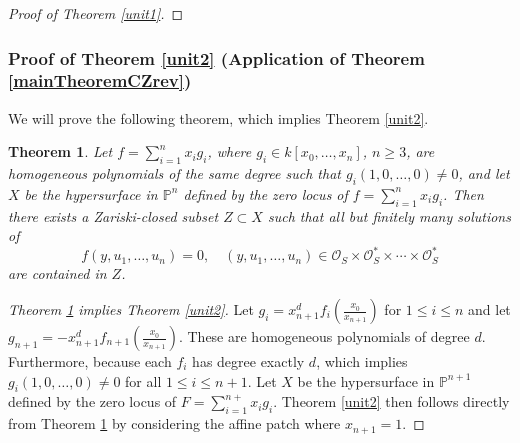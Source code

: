 \documentclass[10pt]{amsart}
\numberwithin{equation}{section}
\theoremstyle{plain}
\newtheorem{theorem}{Theorem}[section]
\theoremstyle{definition}
\begin{document}
\begin{proof}[Proof of Theorem  \ref{unit1}]
\end{proof}
 
 
\subsubsection{\bf Proof of Theorem  \ref{unit2} (Application of Theorem \ref{mainTheoremCZrev})}\label{Secunit2}
We will prove the following theorem, which implies Theorem  \ref{unit2}.
\begin{theorem}\label{UnitCZ}
Let $f=\sum_{i=1}^n x_i g_i$, where $g_i \in k[x_0,\ldots,x_n]$, $n\ge 3$, are homogeneous polynomials of the same degree such that $g_i(1,0,\ldots,0)\ne 0$, and  let $X$  be the hypersurface  in $\mathbb P^n$ defined by the zero locus of  $f=\sum_{i=1}^nx_ig_i$.   Then there exists a Zariski-closed subset $Z \subset X$ such that all but finitely many solutions of
\[
f(y,u_1,\ldots,u_n)=0, \quad (y,u_1,\ldots,u_n)\in \mathcal O_S\times \mathcal O_S^*\times\cdots\times \mathcal O_S^*
\]
are contained in $Z$.
\end{theorem}

\begin{proof}[Theorem \ref{UnitCZ} implies  Theorem  \ref{unit2}]
Let $g_i=x_{n+1}^d f_i(\frac{x_0}{x_{n+1}})$ for $1\le i\le n$ and let $g_{n+1}= -x_{n+1}^d f_{n+1}(\frac{x_0}{x_{n+1}}) $. These are homogeneous polynomials of degree $d$.  Furthermore, because each $f_i$ has degree exactly $d$, which implies
 $g_i(1,0,\hdots,0)\ne 0$ for all  $1\le i\le n+1$.   Let $X$  be the hypersurface  in $\mathbb P^{n+1}$ defined by the zero locus of  $F=\sum_{i=1}^{n+}x_ig_i $.  Theorem  \ref{unit2} then follows directly from Theorem \ref{UnitCZ} by considering the affine patch where $x_{n+1}=1$.
\end{proof}
\end{document}
